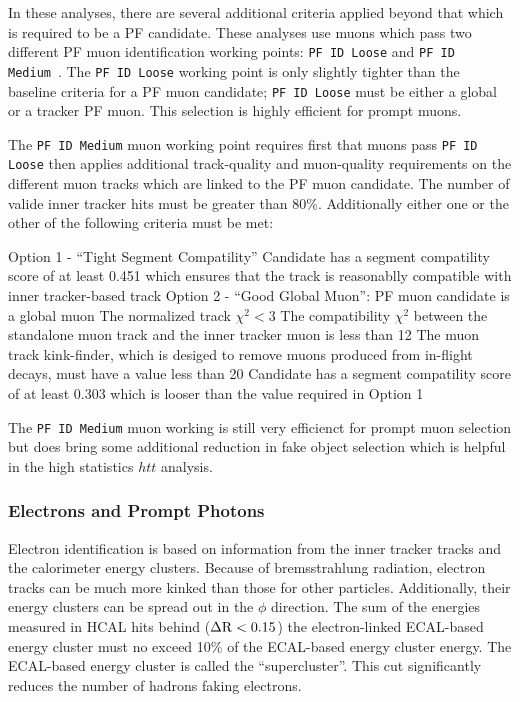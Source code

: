 In these analyses, there are several additional criteria applied beyond that which is required to
be a PF candidate. These analyses use muons which pass two different PF muon identification working
points: \texttt{PF ID Loose} and \texttt{PF ID Medium}~\cite{sm-htt-2017}. The \texttt{PF ID Loose}
working point is only slightly tighter than the baseline criteria for a PF muon candidate; 
\texttt{PF ID Loose} must be either a global or a tracker PF muon. This selection is highly efficient
for prompt muons.

The \texttt{PF ID Medium} muon working point requires first that muons pass \texttt{PF ID Loose} then
applies additional track-quality and muon-quality requirements on the different muon tracks which are
linked to the PF muon candidate. The number of valide inner tracker
hits must be greater than 80\%. Additionally either one or the other of the following criteria must be met:
\begin{outline}
\1 Option 1 - ``Tight Segment Compatility''
    \2 Candidate has a segment compatility score of at least 0.451 which ensures that the 
track is reasonablly compatible with inner tracker-based track
\1 Option 2 - ``Good Global Muon'':
    \2 PF muon candidate is a global muon
    \2 The normalized track $\chi^2 < 3$
    \2 The compatibility $\chi^2$ between the standalone muon track and the inner tracker muon is
less than 12
    \2 The muon track kink-finder, which is desiged to remove muons produced from in-flight decays, 
must have a value less than 20
    \2 Candidate has a segment compatility score of at least 0.303 which is looser than the value
required in Option 1
\end{outline}
The \texttt{PF ID Medium} muon working is still very efficienct for prompt muon selection but
does bring some additional reduction in fake object selection which is helpful in the high
statistics $htt$ analysis. 


\subsubsection{Electrons and Prompt Photons}
Electron identification is based on information from the inner tracker tracks and the calorimeter
energy clusters. Because of bremsstrahlung radiation, electron tracks can be much more kinked
than those for other particles. Additionally, their energy clusters can be spread out in the
$\phi$ direction. The sum of the energies measured in HCAL hits behind ($\Delta \mathrm{R} < 0.15$) 
the electron-linked ECAL-based energy cluster must no exceed 10\% of the ECAL-based 
energy cluster energy. The ECAL-based energy cluster is called the ``supercluster''.
This cut significantly reduces the number of hadrons faking electrons.

